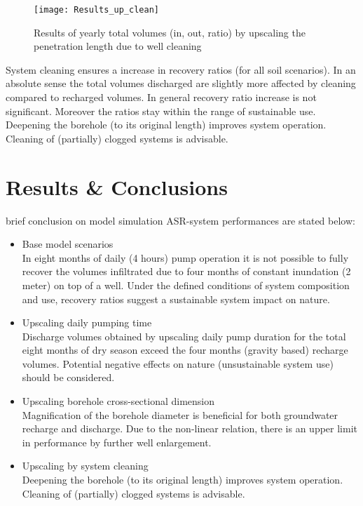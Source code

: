 \begin{figure}[h!]
 \centering
 \texttt{[image: Results\_up\_clean]}
 \captionsetup{justification=centering} 
 \caption{Results of yearly total volumes (in, out, ratio) by upscaling the penetration length due to well cleaning}
 \label{fig:Results_up_clean}
\end{figure}

System cleaning ensures a increase in recovery ratios (for all soil scenarios). In an absolute sense the total volumes discharged are slightly more affected by cleaning compared to recharged volumes. In general recovery ratio increase is not significant. Moreover the ratios stay within the range of sustainable use. Deepening the borehole (to its original length) improves system operation. Cleaning of (partially) clogged systems is advisable. 

\section{Results \& Conclusions}
\label{section:Upscaling_conclusions}
brief conclusion on model simulation ASR-system performances are stated below: 
\begin{itemize}
\item{Base model scenarios} \\
In eight months of daily (4 hours) pump operation it is not possible to fully recover the volumes infiltrated due to four months of constant inundation (2 meter) on top of a well. Under the defined conditions of system composition and use, recovery ratios suggest a sustainable system impact on nature. 
\item{Upscaling daily pumping time}\\
Discharge volumes obtained by upscaling daily pump duration for the total eight months of dry season exceed the four months (gravity based) recharge volumes. Potential negative effects on nature (unsustainable system use) should be considered.
\item{Upscaling borehole cross-sectional dimension}\\
Magnification of the borehole diameter is beneficial for both groundwater recharge and discharge. Due to the non-linear relation, there is an upper limit in performance by further well enlargement.  
\item{Upscaling by system cleaning}\\
Deepening the borehole (to its original length) improves system operation. Cleaning of (partially) clogged systems is advisable. 
\end{itemize}

